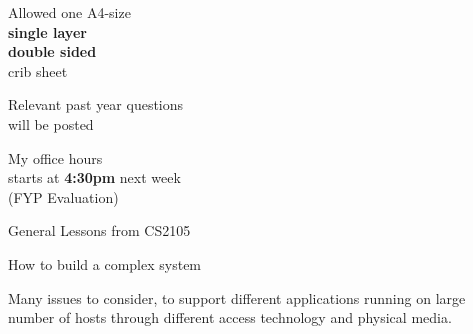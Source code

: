 \begin{cf}
	Allowed one A4-size\\
	\textbf{single layer}\\
	\textbf{double sided}\\
	crib sheet
\end{cf}

\begin{cf}
	Relevant past year questions\\
	will be posted
\end{cf}

\begin{cf}
	My office hours\\
	starts at \textbf{4:30pm} next week\\
	(FYP Evaluation)
\end{cf}

\begin{cf}
	General Lessons from CS2105
\end{cf}

\begin{cf}
	How to build a complex system
\end{cf}

\begin{frame}\begin{center}\normalsize
Many issues to consider, to support different applications running on large number of hosts through different access technology and physical media.
\end{center}\end{frame}

\begin{frame}[plain]
\end{frame}

